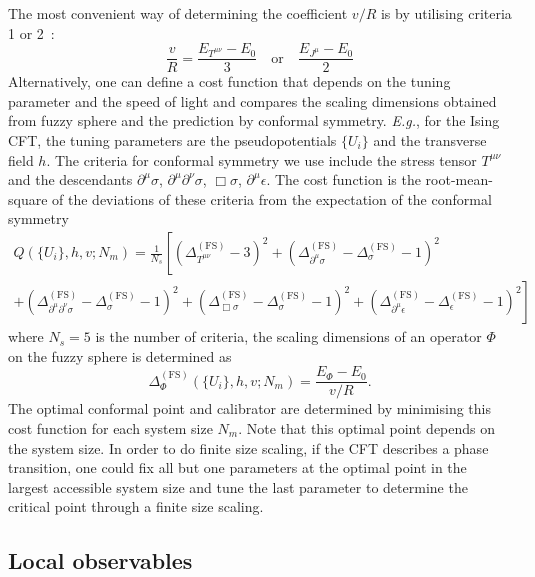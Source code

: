 \documentclass{timesjhep}
\begin{document}
The most convenient way of determining the coefficient $v/R$ is by utilising criteria 1 or 2~: 
\begin{equation}
    \frac{v}{R}=\frac{E_{T^{\mu\nu}}-E_0}{3}\quad\textrm{or}\quad\frac{E_{J^\mu}-E_0}{2}
\end{equation}
Alternatively, one can define a cost function that depends on the tuning parameter and the speed of light and compares the scaling dimensions obtained from fuzzy sphere and the prediction by conformal symmetry. \textit{E.g.}, for the Ising CFT, the tuning parameters are the pseudopotentials $\{U_i\}$ and the transverse field $h$. The criteria for conformal symmetry we use include the stress tensor $T^{\mu\nu}$ and the descendants $\partial^\mu\sigma$, $\partial^\mu\partial^\nu\sigma$, $\Box\sigma$, $\partial^\mu\epsilon$. The cost function is the root-mean-square of the deviations of these criteria from the expectation of the conformal symmetry 
\begin{multline}
    Q(\{U_i\},h,v;N_m)=\frac{1}{N_s}\left[(\Delta_{T^{\mu\nu}}^{(\mathrm{FS})}-3)^2+(\Delta_{\partial^\mu\sigma}^{(\mathrm{FS})}-\Delta_\sigma^{(\mathrm{FS})}-1)^2\right.\\
    \left.+(\Delta_{\partial^\mu\partial^\nu\sigma}^{(\mathrm{FS})}-\Delta_\sigma^{(\mathrm{FS})}-1)^2+(\Delta_{\Box\sigma}^{(\mathrm{FS})}-\Delta_\sigma^{(\mathrm{FS})}-1)^2+(\Delta_{\partial^\mu\epsilon}^{(\mathrm{FS})}-\Delta_\epsilon^{(\mathrm{FS})}-1)^2\right]
\end{multline} 
where $N_s=5$ is the number of criteria, the scaling dimensions of an operator $\Phi$ on the fuzzy sphere is determined as 
\begin{equation}
    \Delta_\Phi^{(\mathrm{FS})}(\{U_i\},h,v;N_m)=\frac{E_\Phi-E_0}{v/R}. 
\end{equation} 
The optimal conformal point and calibrator are determined by minimising this cost function for each system size $N_m$. Note that this optimal point depends on the system size. In order to do finite size scaling, if the CFT describes a phase transition, one could fix all but one parameters at the optimal point in the largest accessible system size and tune the last parameter to determine the critical point through a finite size scaling. 

\subsection{Local observables}
\label{sec:construct_obs}
\end{document}

